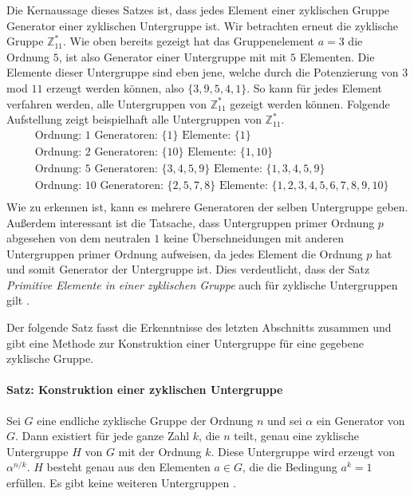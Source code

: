 Die Kernaussage dieses Satzes ist, dass jedes Element einer zyklischen Gruppe Generator einer zyklischen Untergruppe ist.  Wir betrachten erneut die zyklische Gruppe $\mathbb{Z}^*_{11}$. Wie oben bereits gezeigt hat das Gruppenelement $a=3$ die Ordnung $5$, ist also Generator einer Untergruppe mit mit $5$ Elementen. Die Elemente dieser Untergruppe sind eben jene, welche durch die Potenzierung von $3$ mod $11$ erzeugt werden können, also $\{3,9,5,4,1\}$. So kann für jedes Element verfahren werden, alle Untergruppen von $\mathbb{Z}^*_{11}$ gezeigt werden können. Folgende Aufstellung zeigt beispielhaft alle Untergruppen von $\mathbb{Z}^*_{11}$.
\begin{align*}
&\text{Ordnung: } 1 \text{ Generatoren: } \{1\} \text{ Elemente: }\{1\}\\
&\text{Ordnung: } 2 \text{ Generatoren: } \{10\} \text{ Elemente: }\{1,10\}\\
&\text{Ordnung: } 5 \text{ Generatoren: } \{3,4,5,9\} \text{ Elemente: }\{1,3,4,5,9\}\\
&\text{Ordnung: } 10 \text{ Generatoren: } \{2,5,7,8\} \text{ Elemente: } \{1,2,3,4,5,6,7,8,9,10\}\\
\end{align*}
Wie zu erkennen ist, kann es mehrere Generatoren der selben Untergruppe geben. Außerdem interessant ist die Tatsache, dass Untergruppen primer Ordnung $p$ abgesehen von dem neutralen $1$ keine Überschneidungen mit anderen Untergruppen primer Ordnung aufweisen, da jedes Element die Ordnung $p$ hat und somit Generator der Untergruppe ist. Dies verdeutlicht, dass der Satz \textit{Primitive Elemente in einer zyklischen Gruppe} auch für zyklische Untergruppen gilt \cite[S. 244-246]{Paar.2016}.

Der folgende Satz fasst die Erkenntnisse des letzten Abschnitts zusammen und gibt eine Methode zur Konstruktion einer Untergruppe für eine gegebene zyklische Gruppe.

\paragraph{Satz: Konstruktion einer zyklischen Untergruppe}
Sei $G$ eine endliche zyklische Gruppe der Ordnung $n$ und sei $\alpha$ ein Generator von $G$. Dann existiert für jede ganze Zahl $k$, die $n$ teilt, genau eine zyklische Untergruppe $H$ von $G$ mit der Ordnung $k$. Diese Untergruppe wird erzeugt von $\alpha^{n/k}$. $H$ besteht genau aus den Elementen $a \in G$, die die Bedingung $a^k = 1$ erfüllen. Es gibt keine weiteren Untergruppen \cite[S. 246]{Paar.2016}.\\

